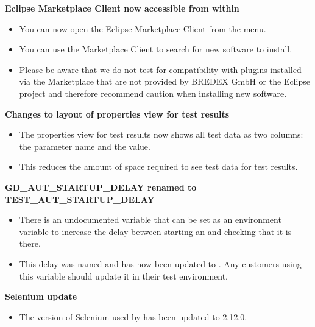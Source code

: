 \textbf{Eclipse Marketplace Client now accessible from within \app{}}
\begin{itemize}
\item You can now open the Eclipse Marketplace Client from the  menu.
\item You can use the Marketplace Client to search for new software to install. 
\item Please be aware that we do not test \app{} for compatibility with plugins installed via the Marketplace that are not provided by BREDEX GmbH or the Eclipse \jb{} project and therefore recommend caution when installing new software. 
\end{itemize}

\textbf{Changes to layout of properties view for test results}\\
\begin{itemize}
\item The properties view for test results now shows all test data as two columns: the parameter name and the value.
\item This reduces the amount of space required to see test data for test results. 
\end{itemize} 


\textbf{GD\_AUT\_STARTUP\_DELAY renamed to TEST\_AUT\_STARTUP\_DELAY}\\
\begin{itemize}
\item There is an undocumented variable that can be set as an environment variable to increase the delay between starting an \gdaut{} and checking that it is there.
\item This delay was named  and has now been updated to . Any customers using this variable should update it in their test environment. 
\end{itemize}

\textbf{Selenium update}
\begin{itemize}
\item The version of Selenium used by \app{} has been updated to 2.12.0.
\end{itemize}
